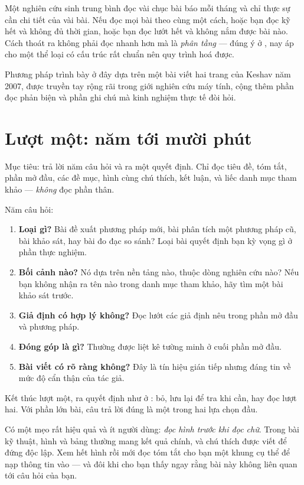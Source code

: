 \documentclass[../../english.tex]{subfiles}
\begin{document}
Một nghiên cứu sinh trung bình đọc vài chục bài báo mỗi tháng và chỉ thực sự cần chi tiết của vài bài. Nếu đọc mọi bài theo cùng một cách, hoặc bạn đọc kỹ hết và không đủ thời gian, hoặc bạn đọc lướt hết và không nắm được bài nào. Cách thoát ra không phải đọc nhanh hơn mà là \emph{phân tầng} --- đúng ý ở , nay áp cho một thể loại có cấu trúc rất chuẩn nên quy trình hoá được.

Phương pháp trình bày ở đây dựa trên một bài viết hai trang của Keshav năm 2007\cite{keshav2007}, được truyền tay rộng rãi trong giới nghiên cứu máy tính, cộng thêm phần đọc phản biện và phần ghi chú mà kinh nghiệm thực tế đòi hỏi.

\section{Lượt một: năm tới mười phút}

Mục tiêu: trả lời năm câu hỏi và ra một quyết định. Chỉ đọc tiêu đề, tóm tắt, phần mở đầu, các đề mục, hình cùng chú thích, kết luận, và liếc danh mục tham khảo --- \emph{không} đọc phần thân.

Năm câu hỏi:

\begin{enumerate}
\item \textbf{Loại gì?} Bài đề xuất phương pháp mới, bài phân tích một phương pháp cũ, bài khảo sát, hay bài đo đạc so sánh? Loại bài quyết định bạn kỳ vọng gì ở phần thực nghiệm.
\item \textbf{Bối cảnh nào?} Nó dựa trên nền tảng nào, thuộc dòng nghiên cứu nào? Nếu bạn không nhận ra tên nào trong danh mục tham khảo, hãy tìm một bài khảo sát trước.
\item \textbf{Giả định có hợp lý không?} Đọc lướt các giả định nêu trong phần mở đầu và phương pháp.
\item \textbf{Đóng góp là gì?} Thường được liệt kê tường minh ở cuối phần mở đầu.
\item \textbf{Bài viết có rõ ràng không?} Đây là tín hiệu gián tiếp nhưng đáng tin về mức độ cẩn thận của tác giả.
\end{enumerate}

Kết thúc lượt một, ra quyết định như ở : bỏ, lưu lại để tra khi cần, hay đọc lượt hai. Với phần lớn bài, câu trả lời đúng là một trong hai lựa chọn đầu.

Có một mẹo rất hiệu quả và ít người dùng: \emph{đọc hình trước khi đọc chữ}. Trong bài kỹ thuật, hình và bảng thường mang kết quả chính, và chú thích được viết để đứng độc lập. Xem hết hình rồi mới đọc tóm tắt cho bạn một khung cụ thể để nạp thông tin vào --- và đôi khi cho bạn thấy ngay rằng bài này không liên quan tới câu hỏi của bạn.
\end{document}
